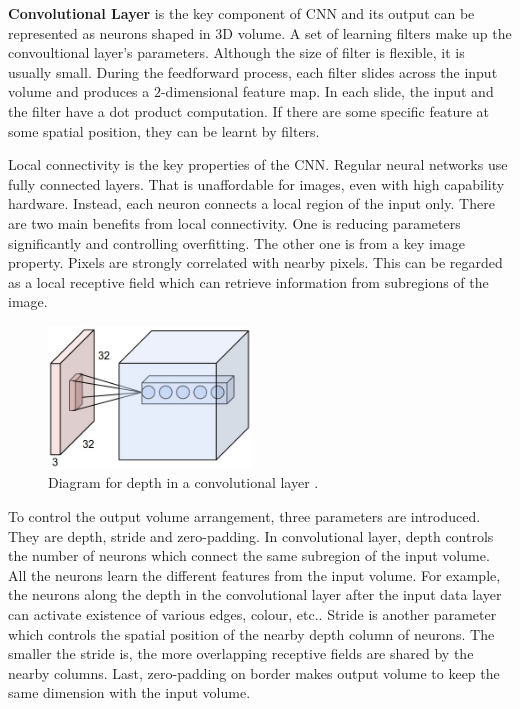 \textbf{Convolutional Layer} is the key component of CNN and its output can be represented as neurons shaped in 3D volume. A set of learning filters make up the convoultional layer's parameters. Although the size of filter is flexible, it is usually small. During the feedforward process, each filter slides across the input volume and produces a $2$-dimensional feature map. In each slide, the input and the filter have a dot product computation. If there are some specific feature at some spatial position, they can be learnt by filters.

Local connectivity is the key properties of the CNN. Regular neural networks use fully connected layers. That is unaffordable for images, even with high capability hardware. Instead, each neuron connects a local region of the input only. There are two main benefits from local connectivity. One is reducing parameters significantly and controlling overfitting. The other one is from a key image property. Pixels are strongly correlated with nearby pixels. This can be regarded as a local receptive field which can retrieve information from subregions of the image.

\graphicspath{ {./Figures/} }
\begin{figure}
  \begin{center}
    \includegraphics[width=0.48\textwidth]{depthcol.jpeg}
  \end{center}
  \caption{Diagram for depth in a convolutional layer \citep{CNNDiagram}.}
\end{figure}
To control the output volume arrangement, three parameters are introduced. They are depth, stride and zero-padding. In convolutional layer, depth controls the number of neurons which connect the same subregion of the input volume. All the neurons learn the different features from the input volume. For example, the neurons along the depth in the convolutional layer after the input data layer can activate existence of various edges, colour, etc.. Stride is another parameter which controls the spatial position of the nearby depth column of neurons. The smaller the stride is, the more overlapping receptive fields are shared by the nearby columns. Last, zero-padding on border makes output volume to keep the same dimension with the input volume.

